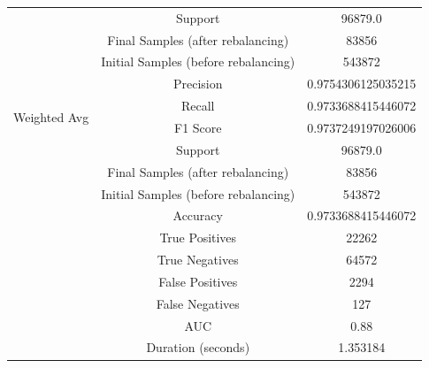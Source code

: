 \begin{longtable}{|c|c|c|}
 & Support & 96879.0 \\
 & Final Samples (after rebalancing) & 83856 \\
 & Initial Samples (before rebalancing) & 543872 \\
\hline
\multirow{4}{*}{Weighted Avg} & Precision & 0.9754306125035215 \\
 & Recall & 0.9733688415446072 \\
 & F1 Score & 0.9737249197026006 \\
 & Support & 96879.0 \\
 & Final Samples (after rebalancing) & 83856 \\
 & Initial Samples (before rebalancing) & 543872 \\
\hline
& Accuracy & 0.9733688415446072 \\ \hline
& True Positives & 22262 \\ \hline
& True Negatives & 64572 \\ \hline
& False Positives & 2294 \\ \hline
& False Negatives & 127 \\ \hline
& AUC & 0.88 \\ \hline
& Duration (seconds) & 1.353184 \\ \hline
\end{longtable}


